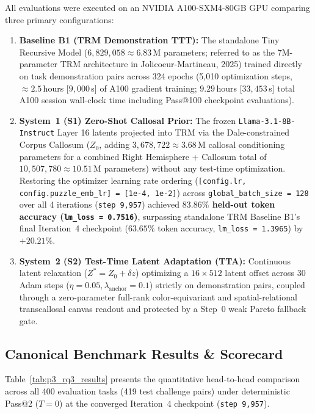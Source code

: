 \documentclass[11pt,a4paper]{article}
\theoremstyle{plain}
\theoremstyle{definition}
\theoremstyle{remark}
\begin{document}
All evaluations were executed on an NVIDIA A100-SXM4-80GB GPU comparing three primary configurations:
\begin{enumerate}
    \item \textbf{Baseline B1 (TRM Demonstration TTT):} The standalone Tiny Recursive Model ($6{,}829{,}058 \approx 6.83$\,M parameters; referred to as the 7M-parameter TRM architecture in Jolicoeur-Martineau, 2025) trained directly on task demonstration pairs across 324 epochs (5,010 optimization steps, $\approx 2.5$\,hours [$9{,}000$\,s] of A100 gradient training; $9.29$\,hours [$33{,}453$\,s] total A100 session wall-clock time including Pass@100 checkpoint evaluations).
    \item \textbf{System~1 (S1) Zero-Shot Callosal Prior:} The frozen \texttt{Llama-3.1-8B-Instruct} Layer 16 latents projected into TRM via the Dale-constrained Corpus Callosum ($Z_0$, adding $3{,}678{,}722 \approx 3.68$\,M callosal conditioning parameters for a combined Right Hemisphere + Callosum total of $10{,}507{,}780 \approx 10.51$\,M parameters) without any test-time optimization. Restoring the optimizer learning rate ordering (\texttt{[config.lr, config.puzzle\_emb\_lr] = [1e-4, 1e-2]}) across \texttt{global\_batch\_size = 128} over all 4 iterations (\texttt{step 9,957}) achieved \textbf{$83.86\%$ held-out token accuracy (\texttt{lm\_loss = 0.7516})}, surpassing standalone TRM Baseline B1's final Iteration~4 checkpoint ($63.65\%$ token accuracy, \texttt{lm\_loss = 1.3965}) by $+20.21\%$.
    \item \textbf{System~2 (S2) Test-Time Latent Adaptation (TTA):} Continuous latent relaxation ($Z^* = Z_0 + \delta z$) optimizing a $16 \times 512$ latent offset across 30 Adam steps ($\eta = 0.05, \lambda_{\mathrm{anchor}} = 0.1$) strictly on demonstration pairs, coupled through a zero-parameter full-rank color-equivariant and spatial-relational transcallosal canvas readout and protected by a Step~0 weak Pareto fallback gate.
\end{enumerate}

\subsection{Canonical Benchmark Results \& Scorecard}

Table~\ref{tab:p3_rq3_results} presents the quantitative head-to-head comparison across all 400 evaluation tasks (419 test challenge pairs) under deterministic Pass@2 ($T = 0$) at the converged Iteration~4 checkpoint (\texttt{step 9,957}).
\end{document}
